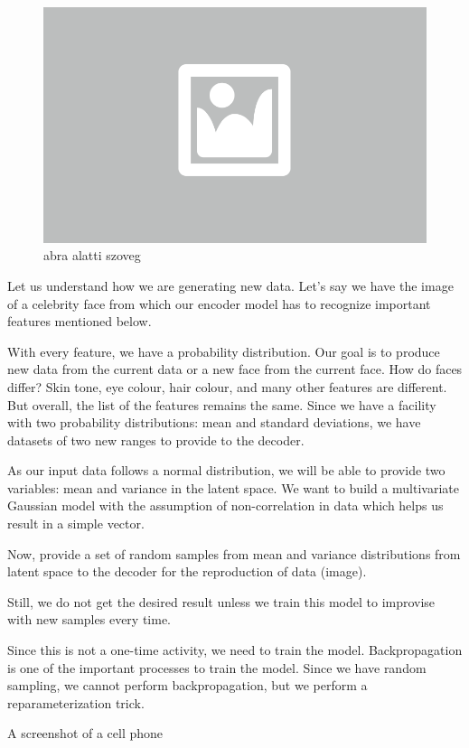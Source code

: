 \begin{figure}[ht]
	\centering
	\includegraphics[width=0.65\columnwidth]{figures/abra.png}
	\caption{abra alatti szoveg}
\end{figure}

Let us understand how we are generating new data. Let’s say we have the image of a celebrity face from which our encoder model has to recognize important features mentioned below. 

With every feature, we have a probability distribution. Our goal is to produce new data from the current data or a new face from the current face. How do faces differ? Skin tone, eye colour, hair colour, and many other features are different. But overall, the list of the features remains the same. Since we have a facility with two probability distributions: mean and standard deviations, we have datasets of two new ranges to provide to the decoder.

As our input data follows a normal distribution, we will be able to provide two variables: mean and variance in the latent space. We want to build a multivariate Gaussian model with the assumption of non-correlation in data which helps us result in a simple vector.

Now, provide a set of random samples from mean and variance distributions from latent space to the decoder for the reproduction of data (image).

Still, we do not get the desired result unless we train this model to improvise with new samples every time.

Since this is not a one-time activity, we need to train the model. Backpropagation is one of the important processes to train the model. Since we have random sampling, we cannot perform backpropagation, but we perform a reparameterization trick. 



A screenshot of a cell phone


